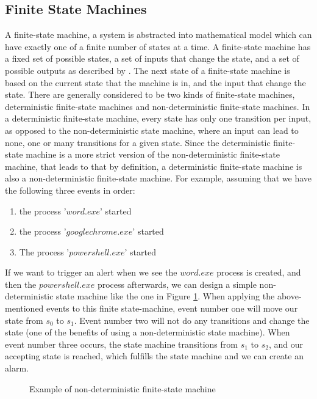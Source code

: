 \subsection{Finite State Machines}
A finite-state machine, a system is abstracted into mathematical model which can have exactly one of a finite number of states at a time. A finite-state machine has a fixed set of possible states, a set of inputs that change the state, and a set of possible outputs as described by \textcite{keller_2001}.
The next state of a finite-state machine is based on the current state that the machine is in, and the input that change the state.
There are generally considered to be two kinds of finite-state machines, deterministic finite-state machines and non-deterministic finite-state machines. In a deterministic finite-state machine, every state has only one transition per input, as opposed to the non-deterministic state machine, where an input can lead to none, one or many transitions for a given state. Since the deterministic finite-state machine is a more strict version of the non-deterministic finite-state machine, that leads to that by definition, a deterministic finite-state machine is also a non-deterministic finite-state machine.
For example, assuming that we have the following three events in order:
\begin{enumerate}
    \item the process '$word.exe$' started
    \item the process '$googlechrome.exe$' started
    \item The process '$powershell.exe$' started
\end{enumerate}
If we want to trigger an alert when we see the $word.exe$ process is created, and then the $powershell.exe$ process afterwards, we can design a simple non-deterministic state machine like the one in Figure \ref{fig:finite-state-machine}. When applying the above-mentioned events to this finite state-machine, event number one will move our state from $s_0$ to $s_1$. Event number two will not do any transitions and change the state (one of the benefits of using a non-deterministic state machine). When event number three occurs, the state machine transitions from $s_1$ to $s_2$, and our accepting state is reached, which fulfills the state machine and we can create an alarm.
\begin{figure}[ht]
\centering
{}
\caption{Example of non-deterministic finite-state machine}
\label{fig:finite-state-machine}
\end{figure}
